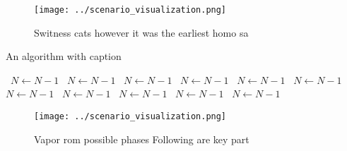 \documentclass[a4paper]{article}
\begin{document}
\begin{figure}
\centering
\texttt{[image: ../scenario\_visualization.png]}
\caption{Switness cats however it was the earliest homo sa
}
\end{figure}
 
\begin{algorithm}
\caption{An algorithm with caption}
\begin{algorithmic}
\    \State $N \gets N - 1$
\    \State $N \gets N - 1$
\    \State $N \gets N - 1$
\    \State $N \gets N - 1$
\    \State $N \gets N - 1$
\    \State $N \gets N - 1$
\    \State $N \gets N - 1$
\    \State $N \gets N - 1$
\    \State $N \gets N - 1$
\    \State $N \gets N - 1$
\    \State $N \gets N - 1$
\EndWhile
\end{algorithmic}
\end{algorithm}

\begin{figure}
\centering
\texttt{[image: ../scenario\_visualization.png]}
\caption{Vapor rom possible phases Following are key part 
}
\end{figure}
 
\end{document}
